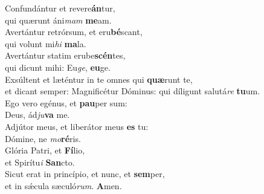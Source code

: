 \evenverse Confundántur et revere\textbf{án}tur,~\*\\
\evenverse qui quærunt áni\textit{mam} \textbf{me}am.\\
\oddverse Avertántur retrórsum, et eru\textbf{bé}scant,~\*\\
\oddverse qui volunt mi\textit{hi} \textbf{ma}la.\\
\evenverse Avertántur statim erube\textbf{scén}tes,~\*\\
\evenverse qui dicunt mihi: Eu\textit{ge}, \textbf{e}\textbf{u}ge.\\
\oddverse Exsúltent et læténtur in te omnes qui \textbf{quæ}runt te,~\*\\
\oddverse et dicant semper: Magnificétur Dóminus: qui díligunt salutá\textit{re} \textbf{tu}um.\\
\evenverse Ego vero egénus, et \textbf{pau}per sum:~\*\\
\evenverse Deus, ád\textit{ju}\textbf{va} me.\\
\oddverse Adjútor meus, et liberátor meus \textbf{es} tu:~\*\\
\oddverse Dómine, ne \textit{mo}\textbf{ré}ris.\\
\evenverse Glória Patri, et \textbf{Fí}lio,~\*\\
\evenverse et Spirítu\textit{i} \textbf{San}cto.\\
\oddverse Sicut erat in princípio, et nunc, et \textbf{sem}per,~\*\\
\oddverse et in sǽcula sæculó\textit{rum}. \textbf{A}men.\\
